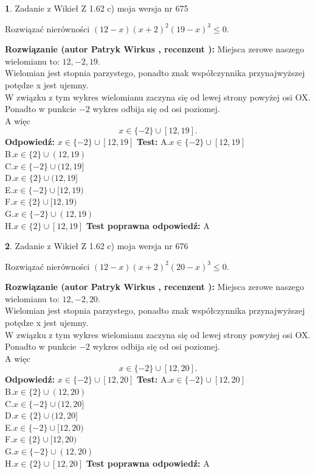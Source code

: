 \documentclass[12pt, a4paper]{article}
\theoremstyle{definition} %
\newtheorem{zad}{}
\newcommand{\zadStart}[1]{\begin{zad}#1\newline}
\newcommand{\zadStop}{\end{zad}}
\newcommand{\rozwStart}[2]{\noindent \textbf{Rozwiązanie (autor #1 , recenzent #2): }\newline}
\newcommand{\rozwStop}{\newline}
\newcommand{\odpStart}{\noindent \textbf{Odpowiedź:}\newline}
\newcommand{\odpStop}{\newline}
\newcommand{\testStart}{\noindent \textbf{Test:}\newline}
\newcommand{\testStop}{\newline}
\newcommand{\kluczStart}{\noindent \textbf{Test poprawna odpowiedź:}\newline}
\newcommand{\kluczStop}{\newline}
\begin{document}
\zadStart{Zadanie z Wikieł Z 1.62 c) moja wersja nr 675}

Rozwiązać nierówności $(12-x)(x+2)^{2}(19-x)^{3}\le0$.
\zadStop
\rozwStart{Patryk Wirkus}{}
Miejsca zerowe naszego wielomianu to: $12, -2, 19$.\\
Wielomian jest stopnia parzystego, ponadto znak współczynnika przy\linebreak najwyższej potędze x jest ujemny.\\ W związku z tym wykres wielomianu zaczyna się od lewej strony powyżej osi OX.\\
Ponadto w punkcie $-2$ wykres odbija się od osi poziomej.\\
A więc $$x \in \{-2\} \cup [12,19].$$
\rozwStop
\odpStart
$x \in \{-2\} \cup [12,19]$
\odpStop
\testStart
A.$x \in \{-2\} \cup [12,19]$\\
B.$x \in \{2\} \cup (12,19)$\\
C.$x \in \{-2\} \cup (12,19]$\\
D.$x \in \{2\} \cup (12,19]$\\
E.$x \in \{-2\} \cup [12,19)$\\
F.$x \in \{2\} \cup [12,19)$\\
G.$x \in \{-2\} \cup (12,19)$\\
H.$x \in \{2\} \cup [12,19]$
\testStop
\kluczStart
A
\kluczStop



\zadStart{Zadanie z Wikieł Z 1.62 c) moja wersja nr 676}

Rozwiązać nierówności $(12-x)(x+2)^{2}(20-x)^{3}\le0$.
\zadStop
\rozwStart{Patryk Wirkus}{}
Miejsca zerowe naszego wielomianu to: $12, -2, 20$.\\
Wielomian jest stopnia parzystego, ponadto znak współczynnika przy\linebreak najwyższej potędze x jest ujemny.\\ W związku z tym wykres wielomianu zaczyna się od lewej strony powyżej osi OX.\\
Ponadto w punkcie $-2$ wykres odbija się od osi poziomej.\\
A więc $$x \in \{-2\} \cup [12,20].$$
\rozwStop
\odpStart
$x \in \{-2\} \cup [12,20]$
\odpStop
\testStart
A.$x \in \{-2\} \cup [12,20]$\\
B.$x \in \{2\} \cup (12,20)$\\
C.$x \in \{-2\} \cup (12,20]$\\
D.$x \in \{2\} \cup (12,20]$\\
E.$x \in \{-2\} \cup [12,20)$\\
F.$x \in \{2\} \cup [12,20)$\\
G.$x \in \{-2\} \cup (12,20)$\\
H.$x \in \{2\} \cup [12,20]$
\testStop
\kluczStart
A
\kluczStop
\end{document}

